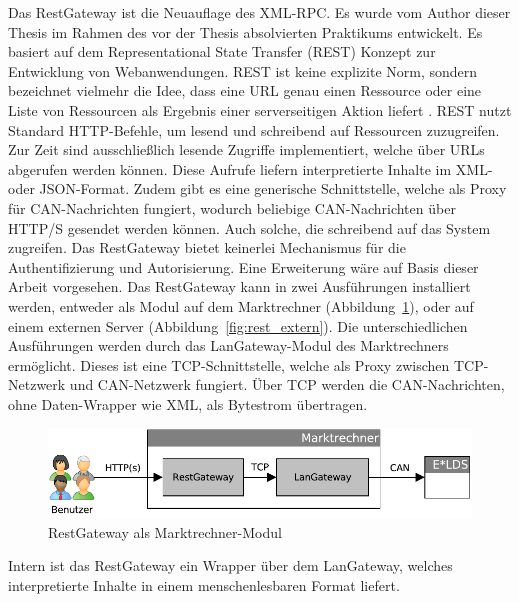 \documentclass[11pt,a4paper]{report}
\begin{document}
Das RestGateway ist die Neuauflage des XML-RPC. Es wurde vom Author dieser Thesis im Rahmen des vor der Thesis absolvierten Praktikums entwickelt. Es basiert auf dem Representational State Transfer (REST) Konzept zur Entwicklung von Webanwendungen. REST ist keine explizite Norm, sondern bezeichnet vielmehr die Idee, dass eine URL genau einen Ressource oder eine Liste von Ressourcen als Ergebnis einer serverseitigen Aktion liefert \cite{wiki_rest}. REST nutzt Standard HTTP-Befehle, um lesend und schreibend auf Ressourcen zuzugreifen. Zur Zeit sind ausschließlich lesende Zugriffe implementiert, welche über URLs abgerufen werden können. Diese Aufrufe liefern interpretierte Inhalte im XML- oder JSON-Format. Zudem gibt es eine generische Schnittstelle, welche als Proxy für CAN-Nachrichten fungiert, wodurch beliebige CAN-Nachrichten über HTTP/S gesendet werden können. Auch solche, die schreibend auf das System zugreifen. Das RestGateway bietet keinerlei Mechanismus für die Authentifizierung und Autorisierung. Eine Erweiterung wäre auf Basis dieser Arbeit vorgesehen. Das RestGateway kann in zwei Ausführungen installiert werden, entweder als Modul auf dem Marktrechner (Abbildung~\ref{fig:rest_intern}), oder auf einem externen Server (Abbildung~\ref{fig:rest_extern}). Die unterschiedlichen Ausführungen werden durch das LanGateway-Modul des Marktrechners ermöglicht. Dieses ist eine TCP-Schnittstelle, welche als Proxy zwischen TCP-Netzwerk und CAN-Netzwerk fungiert. Über TCP werden die CAN-Nachrichten, ohne Daten-Wrapper wie XML, als Bytestrom übertragen.

\begin{figure}[htbp]
\centering
\includegraphics[scale=0.7]{images/RestGateway_intern.pdf}
\caption[]{RestGateway als Marktrechner-Modul}
\label{fig:rest_intern}
\end{figure}

Intern ist das RestGateway ein Wrapper über dem LanGateway, welches interpretierte Inhalte in einem menschenlesbaren Format liefert.
\end{document}
